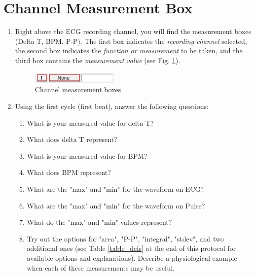 \documentclass{article}
\begin{document}
\section*{Channel Measurement Box}
\begin{enumerate}
	\item Right above the ECG recording channel, you will find the measurement boxes (Delta T, BPM, P-P). The first box indicates the \textit{recording channel} selected, the second box indicates the \textit{function or measurement} to be taken, and the third box contains the \textit{measurement value} (see Fig. \ref{meas_box}).
	
		\begin{figure}[h]
		\includegraphics[width=0.4\textwidth]{../images/BIOPAC_16.jpg}
		\centering
		\caption{Channel measurement boxes}
		\label{meas_box}
		\end{figure}
		
	\item Using the first cycle (first beat), answer the following questions:
		\begin{enumerate}
			\item What is your measured value for delta T?
			\item What does delta T represent?
			\item What is your measured value for BPM?
			\item What does BPM represent?
			\item What are the "max" and "min" for the waveform on ECG?
			\item What are the "max" and "min" for the waveform on Pulse?
			\item What do the "max" and "min" values represent?
			\item Try out the options for "area", "P-P", "integral", "stdev", and two additional ones (see Table \ref{table_defs} at the end of this protocol for available options and explanations). Describe a physiological example when each of these measurements may be useful.
		\end{enumerate}
\end{enumerate}
\end{document}
